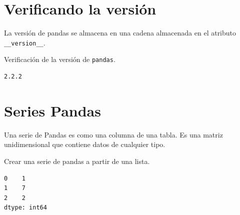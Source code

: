 \section{Verificando la versión}

La versión de pandas se almacena en una cadena almacenada en el atributo \texttt{\_\_version\_\_}.

\begin{code} Verificación de la versión de \texttt{pandas}.
\begin{Shaded}
\begin{Highlighting}[]

\end{Highlighting}
\end{Shaded}

\begin{verbatim}
2.2.2
\end{verbatim}
\end{code}

\section{Series Pandas}

Una serie de Pandas es como una columna de una tabla. Es una matriz unidimensional que contiene datos de cualquier tipo.\\

\begin{code} Crear una serie de pandas a partir de una lista.

\begin{Shaded}
\begin{Highlighting}[]

\OperatorTok{=}\NormalTok{ [}\NormalTok{, }\NormalTok{, }\NormalTok{]}

\OperatorTok{=}

\end{Highlighting}
\end{Shaded}

\begin{verbatim}
0    1
1    7
2    2
dtype: int64
\end{verbatim}
\end{code}

